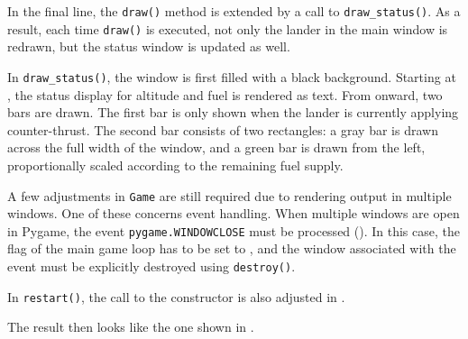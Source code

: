 
In the final line, the \texttt{draw()} method is extended by a call to \texttt{draw\_status()}. As a result, each time \texttt{draw()} is executed, not only the lander in the main window is redrawn, but the status window is updated as well.


In \texttt{draw\_status()}, the window is first filled with a black background. Starting at , the status display for altitude and fuel is rendered as text. From  onward, two bars are drawn. The first bar is only shown when the lander is currently applying counter-thrust. The second bar consists of two rectangles: a gray bar is drawn across the full width of the window, and a green bar is drawn from the left, proportionally scaled according to the remaining fuel supply.


A few adjustments in \texttt{Game} are still required due to rendering output in multiple windows. One of these concerns event handling. When multiple windows are open in Pygame, the event \texttt{pygame.WINDOWCLOSE} must be processed (). In this case, the flag of the main game loop has to be set to \false{}, and the window associated with the event must be explicitly destroyed using \texttt{destroy()}.


In \texttt{restart()}, the call to the constructor is also adjusted in .


The result then looks like the one shown in .



